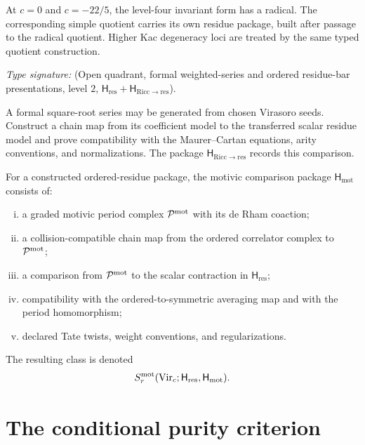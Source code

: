 \begin{remark}
\label{rem:vmp-exclusions}
At \(c=0\) and \(c=-22/5\), the level-four invariant form has a
radical.  The corresponding simple quotient carries its own residue
package, built after passage to the radical quotient.  Higher Kac
degeneracy loci are treated by the same typed quotient construction.
\end{remark}

\begin{problem}
\ClaimStatusOpen
\label{thm:vmp-riccati-vir-recap}
\emph{Type signature:}
\textup{(Open quadrant, formal weighted-series and ordered residue-bar
presentations, level \(2\),
\(\mathsf H_{\mathrm{res}}+\mathsf H_{\mathrm{Ricc}\to\mathrm{res}}\)).}

A formal square-root series may be generated from chosen Virasoro
seeds.  Construct a chain map from its coefficient model to the
transferred scalar residue model and prove compatibility with the
Maurer--Cartan equations, arity conventions, and normalizations.  The
package \(\mathsf H_{\mathrm{Ricc}\to\mathrm{res}}\) records this
comparison.
\end{problem}

\begin{definition}
\ClaimStatusDefinitional
\label{def:vmp-motivic-lift}
For a constructed ordered-residue package, the motivic comparison
package \(\mathsf H_{\mathrm{mot}}\) consists of:
\begin{enumerate}[(i)]
\item a graded motivic period complex \(\mathcal P^{\mathrm{mot}}\) with its
de Rham coaction;
\item a collision-compatible chain map from the ordered correlator
complex to \(\mathcal P^{\mathrm{mot}}\);
\item a comparison from \(\mathcal P^{\mathrm{mot}}\) to the scalar
contraction in \(\mathsf H_{\mathrm{res}}\);
\item compatibility with the ordered-to-symmetric averaging map and
with the period homomorphism;
\item declared Tate twists, weight conventions, and regularizations.
\end{enumerate}
The resulting class is denoted
\[
 S_r^{\mathrm{mot}}(\mathrm{Vir}_c;\mathsf H_{\mathrm{res}},\mathsf H_{\mathrm{mot}}).
\]
\end{definition}

\section{The conditional purity criterion}
\label{sec:vmp-main}

